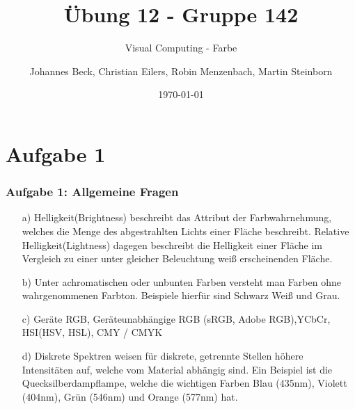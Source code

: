 \documentclass[accentcolor=tud9c,colorbacktitle,inverttitle,landscape,german,presentation,t]{tudbeamer}
\begin{document}
\title{\"Ubung 12 - Gruppe 142}
\subtitle{Visual Computing - Farbe}


\author[Johannes Beck, Christian Eilers, Robin Menzenbach, Martin Steinborn]{Johannes Beck, Christian Eilers, Robin Menzenbach, Martin Steinborn}


\date{\today}

\begin{titleframe}
\end{titleframe}

\section{Aufgabe 1} 
	\begin{frame}
		\frametitle{Aufgabe 1: Allgemeine Fragen}
		\begin{itemize}
			\item[a)]%
				Helligkeit(Brightness) beschreibt das Attribut der Farbwahrnehmung, welches die Menge des abgestrahlten Lichts einer Fläche beschreibt. Relative Helligkeit(Lightness) dagegen beschreibt die Helligkeit einer Fläche im Vergleich zu einer unter gleicher Beleuchtung weiß erscheinenden Fläche.
			\item[b)]%
				Unter achromatischen oder unbunten Farben versteht man Farben ohne wahrgenommenen Farbton. Beispiele hierfür sind Schwarz Weiß und Grau.
			\item[c)]%
				Geräte RGB, Geräteunabhängige RGB (sRGB, Adobe RGB),YCbCr, HSI(HSV, HSL), CMY / CMYK
			\item[d)]%
				Diskrete Spektren weisen für diskrete, getrennte Stellen höhere Intensitäten auf, welche vom Material abhängig sind. Ein Beispiel ist die Quecksilberdampflampe, welche die wichtigen Farben Blau (435nm), Violett (404nm), Grün (546nm) und Orange (577nm) hat.
			
				
		\end{itemize}
	\end{frame}
\end{document}
